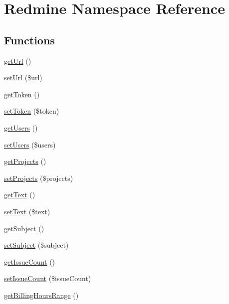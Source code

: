 \hypertarget{namespace_redmine}{}\section{Redmine Namespace Reference}
\label{namespace_redmine}
\subsection*{Functions}
\begin{DoxyCompactItemize}
\item 
\mbox{\hyperlink{namespace_redmine_a2ccb575a43abede07a2cdbe8bfea24fa}{get\+Url}} ()
\item 
\mbox{\hyperlink{namespace_redmine_acc9b6a78b1adb42c8c1349ea4dcba232}{set\+Url}} (\$url)
\item 
\mbox{\hyperlink{namespace_redmine_ab2f1e25f6992a73d074aaeb368e2bdc0}{get\+Token}} ()
\item 
\mbox{\hyperlink{namespace_redmine_a1d837cc954679842432361136a6895c9}{set\+Token}} (\$token)
\item 
\mbox{\hyperlink{namespace_redmine_a209ad0ad13e2884eda66992c4d377a4d}{get\+Users}} ()
\item 
\mbox{\hyperlink{namespace_redmine_a8f0a510d45ae023aadca0cc62f3d72a0}{set\+Users}} (\$users)
\item 
\mbox{\hyperlink{namespace_redmine_a9be2d9a55b3df3a3b4f37a9b4878e813}{get\+Projects}} ()
\item 
\mbox{\hyperlink{namespace_redmine_a67b98dbb37cb8c4e8d8f68155e3fbe0a}{set\+Projects}} (\$projects)
\item 
\mbox{\hyperlink{namespace_redmine_a4850ca0eec8345f1ee03cfcc7294896f}{get\+Text}} ()
\item 
\mbox{\hyperlink{namespace_redmine_a980d608a51d51eec7049f1f566ea57b6}{set\+Text}} (\$text)
\item 
\mbox{\hyperlink{namespace_redmine_ac2b99e9dd9acc77c7afaa9b55c395477}{get\+Subject}} ()
\item 
\mbox{\hyperlink{namespace_redmine_ae00b1697ef0ceff7cdd142c54fd89729}{set\+Subject}} (\$subject)
\item 
\mbox{\hyperlink{namespace_redmine_aefa4df1e77da1c4738d8758d9f3b4193}{get\+Issue\+Count}} ()
\item 
\mbox{\hyperlink{namespace_redmine_ad9ebffe5cfc3f49dd3a620f55536783c}{set\+Issue\+Count}} (\$issue\+Count)
\item 
\mbox{\hyperlink{namespace_redmine_a1ac3a8bc207665303d677efdbbe45668}{get\+Billing\+Hours\+Range}} ()

\end{DoxyCompactItemize}
